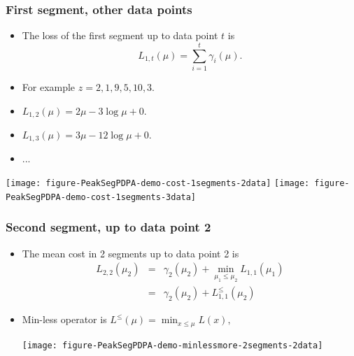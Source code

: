 \documentclass{beamer}
\begin{document}
\begin{frame}
  \frametitle{First segment, other data points}
  \begin{itemize}
\item
  The loss of the first segment up to data point $t$ is
  \begin{equation*}
    \label{eq:C1b}
    L_{1,t}(\mu) = \sum_{i=1}^t \gamma_i(\mu).
  \end{equation*}
\item For example $z = 2, 1, 9, 5, 10, 3$.
\item $L_{1,2}(\mu) = 2\mu - 3\log\mu + 0$.
\item $L_{1,3}(\mu) = 3\mu - 12\log\mu + 0$.
\item ...
  \end{itemize}
  \begin{center}
    \texttt{[image: figure-PeakSegPDPA-demo-cost-1segments-2data]}
    \texttt{[image: figure-PeakSegPDPA-demo-cost-1segments-3data]}
  \end{center}
\end{frame}

\begin{frame}[fragile]
  \frametitle{Second segment, up to data point 2}
  \begin{itemize}
  \item The mean cost in 2 segments up to data point 2 is
\begin{eqnarray*}
  L_{2,2}(\mu_2) 
  &=&  \gamma_2(\mu_2)+\min_{\mu_1 \leq \mu_2} L_{1,1}(\mu_1)\\
  &=& \gamma_2(\mu_2)+L_{1,1}^{\leq}(\mu_2)
\end{eqnarray*}
\item Min-less operator is $L^\leq(\mu) = \min_{x\leq\mu} L(x),$
    \begin{center}
      \texttt{[image: figure-PeakSegPDPA-demo-minlessmore-2segments-2data]}
    \end{center}
\end{itemize}
\end{frame}
\end{document}
